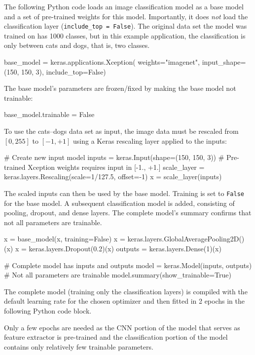The following Python code loads an image classification model as a base model and a set of pre-trained weights for this model. Importantly, it does \emph{not} load the classification layer (\small\texttt{include\_top = False}\normalsize). The original data set the model was trained on has 1000 classes, but in this example application, the classification is only between cats and dogs, that is, two classes.
 
\begin{pythoncode}
base_model = keras.applications.Xception(
    weights="imagenet",
    input_shape=(150, 150, 3),
    include_top=False)
\end{pythoncode}

The base model's parameters are frozen/fixed by making the base model not trainable:
\begin{pythoncode}
base_model.trainable = False
\end{pythoncode}

To use the cats--dogs data set as input, the image data must be rescaled from $[0, 255]$ to $[-1, +1]$ using a Keras rescaling layer applied to the inputs:
\begin{pythoncode}
# Create new input model
inputs = keras.Input(shape=(150, 150, 3))
# Pre-trained Xception weights requires input in [-1., +1.]
scale_layer = keras.layers.Rescaling(scale=1/127.5, offset=-1)
x = scale_layer(inputs)
\end{pythoncode}

The scaled inputs can then be used by the base model. Training is set to \texttt{False} for the base model. A subsequent classification model is added, consisting of pooling, dropout, and dense layers. The complete model's summary confirms that not all parameters are trainable.
\begin{pythoncode}
x = base_model(x, training=False)
x = keras.layers.GlobalAveragePooling2D()(x)
x = keras.layers.Dropout(0.2)(x)
outputs = keras.layers.Dense(1)(x)

# Complete model has inputs and outputs
model = keras.Model(inputs, outputs)
# Not all parameters are trainable
model.summary(show_trainable=True)
\end{pythoncode}

The complete model (training only the classification layers) is compiled with the default learning rate for the chosen optimizer and then fitted in 2 epochs in the following Python code block. 

\begin{infobox}Only a few epochs are needed as the CNN portion of the model that serves as feature extractor is pre-trained and the classification portion of the model contains only relatively few trainable parameters.\end{infobox}

